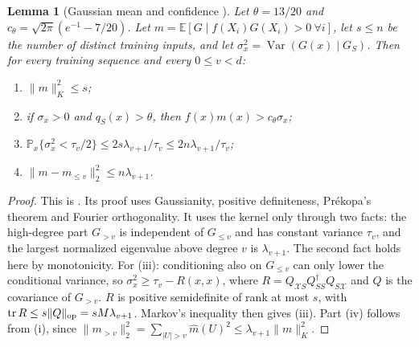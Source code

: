 \documentclass[11pt]{article}
\newtheorem{lemma}[theorem]{Lemma}
\theoremstyle{definition}\newtheorem{assumption}[theorem]{Assumption}
\theoremstyle{remark}\newtheorem{remark}[theorem]{Remark}
\DeclareMathOperator{\Var}{Var}
\newcommand{\E}{\mathbb E}
\newcommand{\Pp}{\mathbb P}
\newcommand{\X}{\mathcal X}
\begin{document}
\begin{lemma}[Gaussian mean and confidence {\cite[Lemma~10.1]{subcritical}}]
\label{lem:meanconf}
Let $\theta=13/20$ and $c_\theta=\sqrt{2\pi}(e^{-1}-7/20)$. Let
$m=\E[G\mid f(X_i)G(X_i)>0\ \forall i]$, let $s\le n$ be the number of
distinct training inputs, and let $\sigma_x^2=\Var(G(x)\mid G_S)$. Then for
every training sequence and every $0\le v<d$:
\begin{enumerate}
\item[(i)] $\|m\|_K^2\le s$;
\item[(ii)] if $\sigma_x>0$ and $q_S(x)>\theta$, then $f(x)m(x)>c_\theta\sigma_x$;
\item[(iii)] $\Pp_x\{\sigma_x^2<\tau_v/2\}\le2s\lambda_{v+1}/\tau_v\le2n\lambda_{v+1}/\tau_v$;
\item[(iv)] $\|m-m_{\le v}\|_2^2\le n\lambda_{v+1}$.
\end{enumerate}
\end{lemma}
\begin{proof}
This is \cite[Lemma~10.1]{subcritical}. Its proof uses Gaussianity,
positive definiteness, Pr\'ekopa's theorem \cite{prekopa} and Fourier
orthogonality.
It uses the kernel only through two facts: the high-degree part $G_{>v}$
is independent of $G_{\le v}$ and has constant variance $\tau_v$, and the
largest normalized eigenvalue above degree $v$ is $\lambda_{v+1}$. The
second fact holds here by monotonicity. For (iii): conditioning also on
$G_{\le v}$ can only lower the conditional variance, so
$\sigma_x^2\ge\tau_v-R(x,x)$, where
$R=Q_{\X S}Q_{SS}^{\dagger}Q_{S\X}$ and $Q$ is the covariance of $G_{>v}$.
$R$ is positive semidefinite of rank at most $s$, with
$\operatorname{tr}R\le s\|Q\|_{\rm op}=sM\lambda_{v+1}$. Markov's inequality
then gives (iii). Part (iv) follows from (i), since
$\|m_{>v}\|_2^2=\sum_{|U|>v}\widehat m(U)^2\le\lambda_{v+1}\|m\|_K^2$.
\end{proof}
\end{document}

